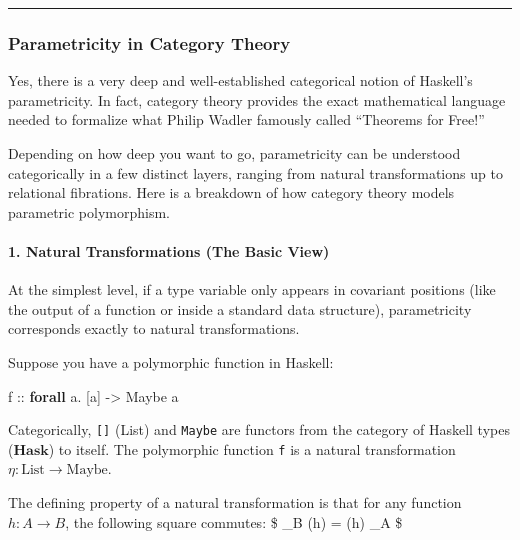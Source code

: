\documentclass[
]{article}
\newenvironment{Shaded}{}{}
\newcommand{\DataTypeTok}[1]{\textcolor[rgb]{0.56,0.13,0.00}{#1}}
\newcommand{\KeywordTok}[1]{\textcolor[rgb]{0.00,0.44,0.13}{\textbf{#1}}}
\newcommand{\NormalTok}[1]{#1}
\newcommand{\OperatorTok}[1]{\textcolor[rgb]{0.40,0.40,0.40}{#1}}
\newcommand{\OtherTok}[1]{\textcolor[rgb]{0.00,0.44,0.13}{#1}}
\begin{document}
\begin{center}\rule{0.5\linewidth}{0.5pt}\end{center}

\subsubsection{Parametricity in Category
Theory}\label{parametricity-in-category-theory}

Yes, there is a very deep and well-established categorical notion of
Haskell's parametricity. In fact, category theory provides the exact
mathematical language needed to formalize what Philip Wadler famously
called ``Theorems for Free!''

Depending on how deep you want to go, parametricity can be understood
categorically in a few distinct layers, ranging from natural
transformations up to relational fibrations. Here is a breakdown of how
category theory models parametric polymorphism.

\paragraph{1. Natural Transformations (The Basic
View)}\label{natural-transformations-the-basic-view}

At the simplest level, if a type variable only appears in covariant
positions (like the output of a function or inside a standard data
structure), parametricity corresponds exactly to natural
transformations.

Suppose you have a polymorphic function in Haskell:

\begin{Shaded}
\begin{Highlighting}[]
\OtherTok{f ::} \KeywordTok{forall}\NormalTok{ a}\OperatorTok{.}\NormalTok{ [a] }\OtherTok{{-}\textgreater{}} \DataTypeTok{Maybe}\NormalTok{ a}
\end{Highlighting}
\end{Shaded}

Categorically, \texttt{{[}{]}} (List) and \texttt{Maybe} are functors
from the category of Haskell types (\(\mathbf{Hask}\)) to itself. The
polymorphic function \texttt{f} is a natural transformation
\(\eta : \text{List} \to \text{Maybe}\).

The defining property of a natural transformation is that for any
function \(h : A \to B\), the following square commutes: \$ \eta\_B
\circ {}(h) = (h) \circ \eta\_A \$
\end{document}
